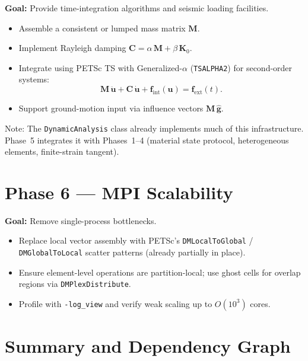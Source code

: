 \textbf{Goal:} Provide time-integration algorithms and seismic loading
facilities.

\begin{itemize}
  \item Assemble a consistent or lumped mass matrix $\mathbf{M}$.
  \item Implement Rayleigh damping
        $\mathbf{C} = \alpha\,\mathbf{M} + \beta\,\mathbf{K}_0$.
  \item Integrate using PETSc TS with Generalized-$\alpha$
        (\texttt{TSALPHA2}) for second-order systems:
        \[
          \mathbf{M}\,\ddot{\mathbf{u}} + \mathbf{C}\,\dot{\mathbf{u}}
            + \mathbf{f}_{\mathrm{int}}(\mathbf{u})
            = \mathbf{f}_{\mathrm{ext}}(t).
        \]
  \item Support ground-motion input via influence vectors
        $\mathbf{M}\,\hat{\mathbf{g}}$.
\end{itemize}

Note: The \texttt{DynamicAnalysis} class already implements much of this
infrastructure.  Phase~5 integrates it with Phases~1--4 (material state
protocol, heterogeneous elements, finite-strain tangent).

\section{Phase 6 — MPI Scalability}
\label{sec:phase6-overview}

\textbf{Goal:} Remove single-process bottlenecks.

\begin{itemize}
  \item Replace local vector assembly with PETSc's
        \texttt{DMLocalToGlobal} / \texttt{DMGlobalToLocal} scatter
        patterns (already partially in place).
  \item Ensure element-level operations are partition-local; use ghost
        cells for overlap regions via \texttt{DMPlexDistribute}.
  \item Profile with \texttt{-log\_view} and verify weak scaling
        up to $O(10^3)$ cores.
\end{itemize}

\section{Summary and Dependency Graph}

